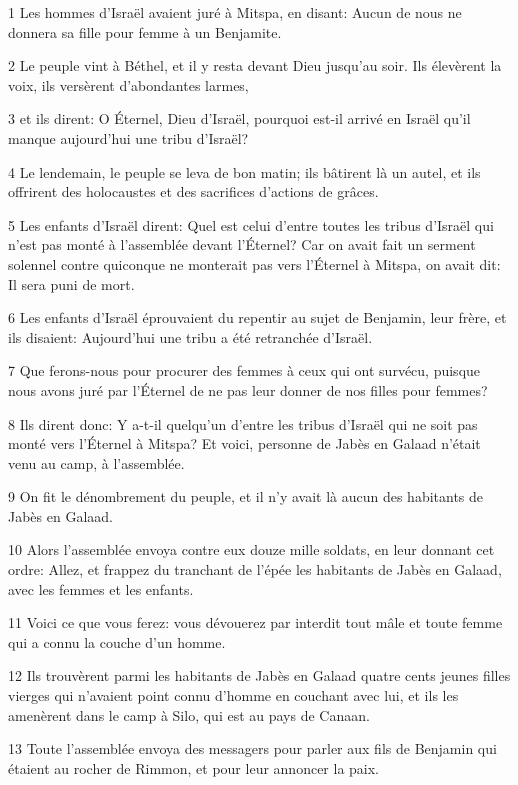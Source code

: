 \par 1 Les hommes d'Israël avaient juré à Mitspa, en disant: Aucun de nous ne donnera sa fille pour femme à un Benjamite.
\par 2 Le peuple vint à Béthel, et il y resta devant Dieu jusqu'au soir. Ils élevèrent la voix, ils versèrent d'abondantes larmes,
\par 3 et ils dirent: O Éternel, Dieu d'Israël, pourquoi est-il arrivé en Israël qu'il manque aujourd'hui une tribu d'Israël?
\par 4 Le lendemain, le peuple se leva de bon matin; ils bâtirent là un autel, et ils offrirent des holocaustes et des sacrifices d'actions de grâces.
\par 5 Les enfants d'Israël dirent: Quel est celui d'entre toutes les tribus d'Israël qui n'est pas monté à l'assemblée devant l'Éternel? Car on avait fait un serment solennel contre quiconque ne monterait pas vers l'Éternel à Mitspa, on avait dit: Il sera puni de mort.
\par 6 Les enfants d'Israël éprouvaient du repentir au sujet de Benjamin, leur frère, et ils disaient: Aujourd'hui une tribu a été retranchée d'Israël.
\par 7 Que ferons-nous pour procurer des femmes à ceux qui ont survécu, puisque nous avons juré par l'Éternel de ne pas leur donner de nos filles pour femmes?
\par 8 Ils dirent donc: Y a-t-il quelqu'un d'entre les tribus d'Israël qui ne soit pas monté vers l'Éternel à Mitspa? Et voici, personne de Jabès en Galaad n'était venu au camp, à l'assemblée.
\par 9 On fit le dénombrement du peuple, et il n'y avait là aucun des habitants de Jabès en Galaad.
\par 10 Alors l'assemblée envoya contre eux douze mille soldats, en leur donnant cet ordre: Allez, et frappez du tranchant de l'épée les habitants de Jabès en Galaad, avec les femmes et les enfants.
\par 11 Voici ce que vous ferez: vous dévouerez par interdit tout mâle et toute femme qui a connu la couche d'un homme.
\par 12 Ils trouvèrent parmi les habitants de Jabès en Galaad quatre cents jeunes filles vierges qui n'avaient point connu d'homme en couchant avec lui, et ils les amenèrent dans le camp à Silo, qui est au pays de Canaan.
\par 13 Toute l'assemblée envoya des messagers pour parler aux fils de Benjamin qui étaient au rocher de Rimmon, et pour leur annoncer la paix.
